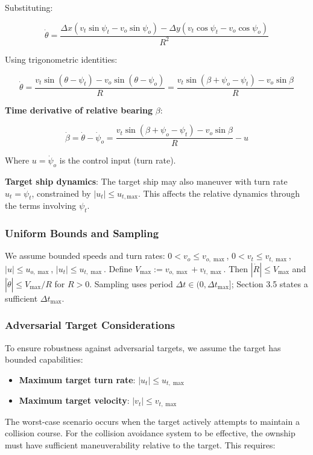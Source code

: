 \documentclass[11pt,a4paper]{article}
\numberwithin{equation}{section}
\begin{document}
Substituting:

\[
\dot{\theta} = \frac{\Delta x(v_t\sin\psi_t - v_o\sin\psi_o) - \Delta y(v_t\cos\psi_t - v_o\cos\psi_o)}{R^2}
\]

Using trigonometric identities:

\[
\dot{\theta} = \frac{v_t\sin(\theta - \psi_t) - v_o\sin(\theta - \psi_o)}{R} = \frac{v_t\sin(\beta + \psi_o - \psi_t) - v_o\sin\beta}{R}
\]

\textbf{Time derivative of relative bearing} $\beta$:

\[
\dot{\beta} = \dot{\theta} - \dot{\psi}_o = \frac{v_t\sin(\beta + \psi_o - \psi_t) - v_o\sin\beta}{R} - u
\]

Where $u = \dot{\psi}_o$ is the control input (turn rate).

\textbf{Target ship dynamics}: The target ship may also maneuver with turn rate $u_t = \dot{\psi}_t$, constrained by $\lvert u_t \rvert \le u_{t,\mathrm{max}}$. This affects the relative dynamics through the terms involving $\psi_t$.

\subsubsection{Uniform Bounds and Sampling}

We assume bounded speeds and turn rates: $0<v_o\le v_{o,\max}$, $0<v_t\le v_{t,\max}$, $|u|\le u_{o,\max}$, $|u_t|\le u_{t,\max}$. Define $V_{\max}:=v_{o,\max}+v_{t,\max}$. Then $|\dot R|\le V_{\max}$ and $|\dot \theta|\le V_{\max}/R$ for $R>0$. Sampling uses period $\Delta t\in (0,\Delta t_{\max}]$; Section 3.5 states a sufficient $\Delta t_{\max}$.

\subsubsection{Adversarial Target Considerations}

To ensure robustness against adversarial targets, we assume the target has bounded capabilities:
\begin{itemize}
\item \textbf{Maximum target turn rate}: $|u_t| \leq u_{t,\max}$
\item \textbf{Maximum target velocity}: $|v_t| \leq v_{t,\max}$
\end{itemize}

The worst-case scenario occurs when the target actively attempts to maintain a collision course. For the collision avoidance system to be effective, the ownship must have sufficient maneuverability relative to the target. This requires:
\end{document}
